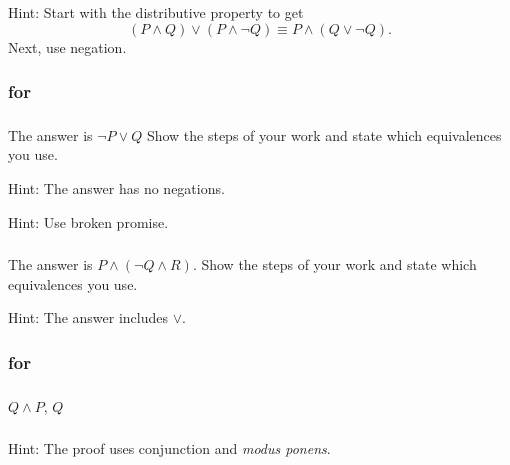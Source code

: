 \subsubsection*{ \answers}
Hint: Start with the distributive property to get $$(P \land Q) \lor (P \land \neg Q) \equiv P \land (Q \lor \neg Q).$$
Next, use negation.

\subsubsection{\answers for  \subneg}

\subsubsection*{ \answers}
\begin{apart}
\item The answer is $\neg P \lor Q$ Show the steps of your work and state which equivalences you use.
\item Hint: The answer has no negations.
\item Hint: Use broken promise.
\end{apart}

\subsubsection*{ \answers}
\begin{apart}
    \item The answer is $P \land (\neg Q \land R)$. Show the steps of your work and state which equivalences you use.
    \item Hint: The answer includes $\lor$.
\end{apart}

\subsubsection{\answers for  \subinference}

\subsubsection*{ \answers}
$Q \land P$, $Q$

\subsubsection*{ \answers}
Hint: The proof uses conjunction and \emph{modus ponens}.

